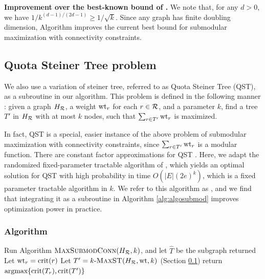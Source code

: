 \noindent
\textbf{Improvement over the best-known bound of \cite{kuo2015maximizing}.} We note that, for any $d> 0$, we have $1/k^{(d-1)/(2d-1)}\geq 1/\sqrt{k}$. Since any graph has finite doubling dimension, Algorithm \algosubmod{} improves the current best bound for submodular maximization with connectivity constraints.


\subsection{Quota Steiner Tree problem}
\label{sec:algomaxst}
We also use a variation of steiner tree, referred to as Quota Steiner Tree (\textsc{QST}), as a subroutine in our algorithm. This problem is defined in the following manner \cite{Johnson2000PCS}:
given a graph $H_{\mathcal{R}}$, a weight $\text{wt}_r$ for each $r\in \mathcal{R}$, and a parameter $k$, find a tree $T'$ in $H_{\mathcal{R}}$ with at most $k$ nodes, such that $\sum_{r\in T'} \text{wt}_r$ is maximized.


In fact, \textsc{QST} is a special, easier instance of the above problem of submodular maximization with connectivity constraints, since $\sum_{r\in T'} \text{wt}_r$ is a modular function.
There are constant factor approximations for QST \cite{ravi1996spanning}. Here, we adapt the randomized fixed-parameter tractable algorithm of \cite{cadena:sdm17}, which yields an optimal solution for \textsc{QST}  with high probability in time $O(|E|(2e)^k)$, which is a fixed parameter tractable algorithm in $k$. We refer to this algorithm as \algomaxst{}, and we find that integrating it as a subroutine in Algorithm \ref{alg:algosubmod} improves optimization power in practice.

\subsubsection{Algorithm \algomaxcrit{}}
\begin{algorithm}{}
\small
\caption{\small $\algomaxcrit(H_{\R}, k)$}
\label{alg:algomaxcrit}
\begin{algorithmic}[1]
\STATE Run Algorithm $\textsc{MaxSubmodConn}(H_{\mathcal{R}}, k)$, and let $\hat{T}$ be the subgraph returned
  \STATE Let $\text{wt}_r = \text{crit}(r)$
\ENDFOR
\STATE Let $T'=\text{$k$-\textsc{MaxST}}(H_{\mathcal{R}}, \text{wt}, k)$ (Section \ref{sec:algomaxst})
\STATE return $\mbox{argmax}\{\text{crit}(T_r), \text{crit}(T')\}$
\end{algorithmic}
\end{algorithm}



